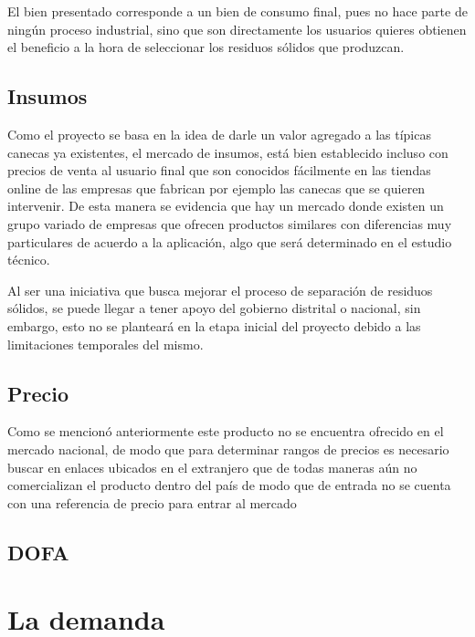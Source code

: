 \documentclass{report}
\begin{document}
    El bien presentado corresponde a un bien de consumo final, pues no hace parte de ningún proceso industrial, sino que son directamente los usuarios quieres obtienen el beneficio a la hora de seleccionar los residuos sólidos que produzcan.

    \section{Insumos}

    Como el proyecto se basa en la idea de darle un valor agregado a las típicas canecas ya existentes, el mercado de insumos, está bien establecido incluso con precios de venta al usuario final que son conocidos fácilmente en las tiendas online de las empresas que fabrican por ejemplo las canecas que se quieren intervenir. De esta manera se evidencia que hay un mercado donde existen un grupo variado de empresas que ofrecen productos similares con diferencias muy particulares de acuerdo a la aplicación, algo que será determinado en el estudio técnico.

    Al ser una iniciativa que busca mejorar el proceso de separación de residuos sólidos, se puede llegar a tener apoyo del gobierno distrital o nacional, sin embargo, esto no se planteará en la etapa inicial del proyecto debido a las limitaciones temporales del mismo.

    \section{Precio}
Como se mencionó anteriormente este producto no se encuentra ofrecido en el mercado nacional, de modo que para determinar rangos de precios es necesario buscar en enlaces ubicados en el extranjero que de todas maneras aún no comercializan el producto dentro del país de modo que de entrada no se cuenta con una referencia de precio para entrar al mercado

    \section{DOFA}

\chapter{La demanda}
\end{document}
